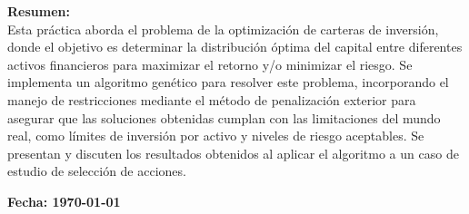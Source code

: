 \begin{titlepage}
\begin{center}
        \begin{minipage}{0.8\textwidth}
            \textbf{Resumen:}\\[0.15cm]
            Esta práctica aborda el problema de la optimización de carteras de inversión, donde el objetivo es determinar la distribución óptima del capital entre diferentes activos financieros para maximizar el retorno y/o minimizar el riesgo. Se implementa un algoritmo genético para resolver este problema, incorporando el manejo de restricciones mediante el método de penalización exterior para asegurar que las soluciones obtenidas cumplan con las limitaciones del mundo real, como límites de inversión por activo y niveles de riesgo aceptables. Se presentan y discuten los resultados obtenidos al aplicar el algoritmo a un caso de estudio de selección de acciones.
        \end{minipage}

        \vspace{0.3cm}

        \textbf{\large Fecha: \today}

    \end{center}
\end{titlepage}
